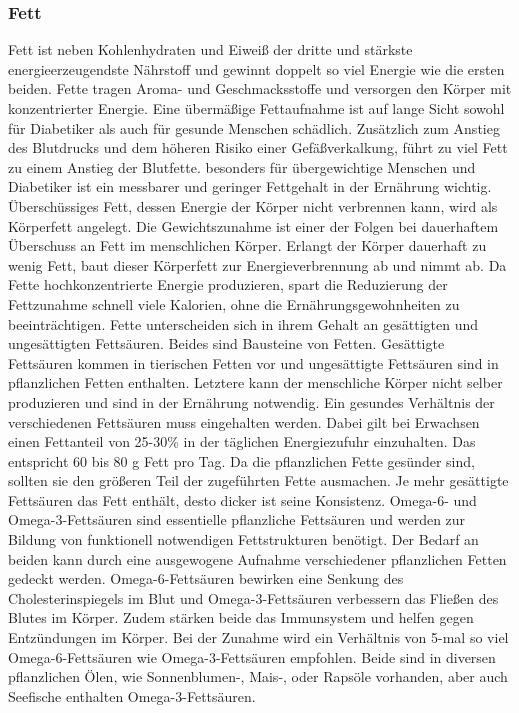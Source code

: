 	\subsubsection{Fett}
		Fett ist neben Kohlenhydraten und Eiweiß der dritte und stärkste energieerzeugendste Nährstoff und gewinnt doppelt so viel Energie wie die ersten beiden. Fette tragen Aroma- und Geschmacksstoffe und versorgen den Körper mit konzentrierter Energie. Eine übermäßige Fettaufnahme ist auf lange Sicht sowohl für Diabetiker als auch für gesunde Menschen schädlich. Zusätzlich zum Anstieg des Blutdrucks und dem höheren Risiko einer Gefäßverkalkung, führt zu viel Fett zu einem Anstieg der Blutfette. besonders für übergewichtige Menschen und Diabetiker ist ein messbarer und geringer Fettgehalt in der Ernährung wichtig. \cite{SG} Überschüssiges Fett, dessen Energie der Körper nicht verbrennen kann, wird als Körperfett angelegt. Die Gewichtszunahme ist einer der Folgen bei dauerhaftem Überschuss an Fett im menschlichen Körper. Erlangt der Körper dauerhaft zu wenig Fett, baut dieser Körperfett zur Energieverbrennung ab und nimmt ab.\cite{ND} Da Fette hochkonzentrierte Energie produzieren, spart die Reduzierung der Fettzunahme schnell viele Kalorien, ohne die Ernährungsgewohnheiten zu beeinträchtigen.\cite{SG}\newline
		Fette unterscheiden sich in ihrem Gehalt an gesättigten und ungesättigten Fettsäuren. Beides sind Bausteine von Fetten. Gesättigte Fettsäuren kommen in tierischen Fetten vor und ungesättigte Fettsäuren sind in pflanzlichen Fetten enthalten. Letztere kann der menschliche Körper nicht selber produzieren und sind in der Ernährung notwendig. Ein gesundes Verhältnis der verschiedenen Fettsäuren muss eingehalten werden. Dabei gilt bei Erwachsen einen Fettanteil von 25-30\% in der täglichen Energiezufuhr einzuhalten. Das entspricht 60 bis 80 g Fett pro Tag. Da die pflanzlichen Fette gesünder sind, sollten sie den größeren Teil der zugeführten Fette ausmachen. Je mehr gesättigte Fettsäuren das Fett enthält, desto dicker ist seine Konsistenz. \newline
		Omega-6- und Omega-3-Fettsäuren sind essentielle pflanzliche Fettsäuren und werden zur Bildung von funktionell notwendigen Fettstrukturen benötigt. Der Bedarf an beiden kann durch eine ausgewogene Aufnahme verschiedener pflanzlichen Fetten gedeckt werden. Omega-6-Fettsäuren bewirken eine Senkung des Cholesterinspiegels im Blut und Omega-3-Fettsäuren verbessern das Fließen des Blutes im Körper. Zudem stärken beide das Immunsystem und helfen gegen Entzündungen im Körper. Bei der Zunahme wird ein Verhältnis von 5-mal so viel Omega-6-Fettsäuren wie Omega-3-Fettsäuren empfohlen. Beide sind in diversen pflanzlichen Ölen, wie Sonnenblumen-, Mais-, oder Rapsöle vorhanden, aber auch Seefische enthalten Omega-3-Fettsäuren.\cite{ND}\newline
